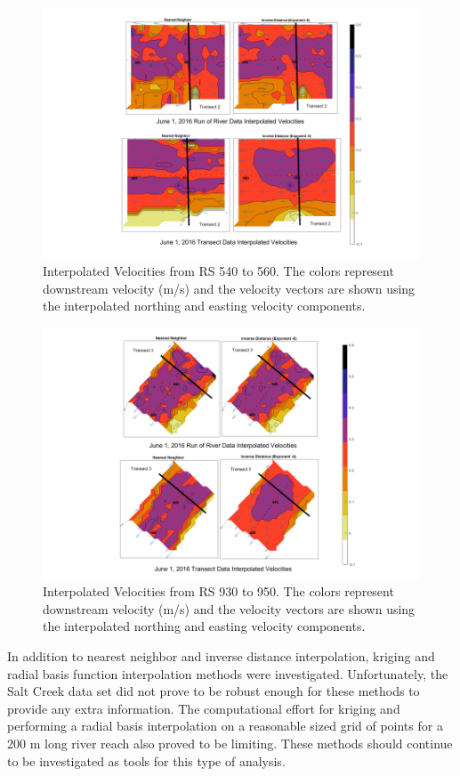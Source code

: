 \documentclass[Journal,letterpaper,BackFigs]{ascelike-new}
\begin{document}
\begin{figure}
\centering
\includegraphics[width=5.5in]{Results540_560.pdf}
\caption{Interpolated Velocities from RS 540 to 560. The colors represent downstream velocity (m/s) and the velocity vectors are shown using the interpolated northing and easting velocity components.}
\label{fig:Results540_560}
\end{figure}

\begin{figure}
\centering
\includegraphics[width=5.5in]{Results930_950.pdf}
\caption{Interpolated Velocities from RS 930 to 950. The colors represent downstream velocity (m/s) and the velocity vectors are shown using the interpolated northing and easting velocity components.}
\label{fig:Results930_950}
\end{figure}

In addition to nearest neighbor and inverse distance interpolation, kriging and radial basis function interpolation methods were investigated. Unfortunately, the Salt Creek data set did not prove to be robust enough for these methods to provide any extra information. The computational effort for kriging and performing a radial basis interpolation on a reasonable sized grid of points for a 200 m long river reach also proved to be limiting. These methods should continue to be investigated as tools for this type of analysis.
\end{document}
